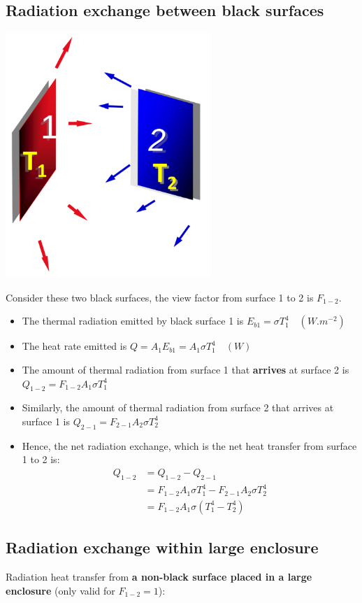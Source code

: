 \documentclass[11pt]{article}
\begin{document}
\subsection{Radiation exchange between black surfaces}
\label{sec:org99975e1}
\begin{center}
\includegraphics[height=25em]{./images/radiation-exchange-between-black-surfaces-diagram.png}
\end{center}
Consider these two black surfaces, the view factor from surface 1 to 2 is \(F_{1-2}\).
\begin{itemize}
\item The thermal radiation emitted by black surface 1 is \(E_{b1} = \sigma T_1^4 \quad (\unit{W.m^{-2}})\)
\item The heat rate emitted is \(Q = A_1 E_{b1} = A_1 \sigma T_1^4 \quad (\unit{W})\)
\item The amount of thermal radiation from surface 1 that \textbf{arrives} at surface 2 is \(Q_{1-2} = F_{1-2} A_1 \sigma T_1^4\)
\item Similarly, the amount of thermal radiation from surface 2 that arrives at surface 1 is \(Q_{2-1} = F_{2-1} A_2 \sigma T_2^4\)
\item Hence, the net radiation exchange, which is the net heat transfer from surface 1 to 2 is:
\begin{align*}
Q_{1-2} &= Q_{1-2} - Q_{2-1} \\
&= F_{1-2} A_1 \sigma T_1^4 - F_{2-1} A_2 \sigma T_2^4 \\
&= F_{1-2} A_1 \sigma \left(T_1^4 - T_2^4 \right)
\end{align*}
\end{itemize}
\subsection{Radiation exchange within large enclosure}
\label{sec:orge06bfff}
Radiation heat transfer from \textbf{a non-black surface placed in a large enclosure} (only valid for \(F_{1-2} = 1\)):
\end{document}
